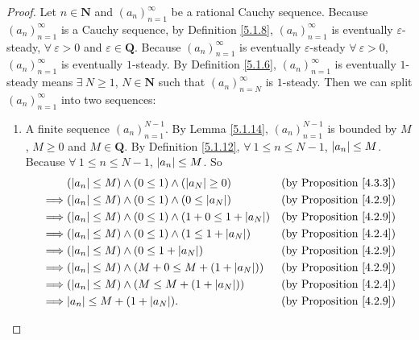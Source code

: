 \begin{proof}
    Let \(n \in \mathbf{N}\) and \((a_n)_{n = 1}^{\infty}\) be a rational Cauchy sequence.
    Because \((a_n)_{n = 1}^{\infty}\) is a Cauchy sequence, by Definition \ref{5.1.8}, \((a_n)_{n = 1}^{\infty}\) is eventually \(\varepsilon\)-steady, \(\forall\ \varepsilon > 0\) and \(\varepsilon \in \mathbf{Q}\).
    Because \((a_n)_{n = 1}^{\infty}\) is eventually \(\varepsilon\)-steady \(\forall\ \varepsilon > 0\), \((a_n)_{n = 1}^{\infty}\) is eventually \(1\)-steady.
    By Definition \ref{5.1.6}, \((a_n)_{n = 1}^{\infty}\) is eventually \(1\)-steady means \(\exists\ N \geq 1\), \(N \in \mathbf{N}\) such that \((a_n)_{n = N}^{\infty}\) is \(1\)-steady.
    Then we can split \((a_n)_{n = 1}^{\infty}\) into two sequences:
    \begin{enumerate}
        \item A finite sequence \((a_n)_{n = 1}^{N - 1}\).
              By Lemma \ref{5.1.14}, \((a_n)_{n = 1}^{N - 1}\) is bounded by \(M\), \(M \geq 0\) and \(M \in \mathbf{Q}\).
              By Definition \ref{5.1.12}, \(\forall\ 1 \leq n \leq N - 1\), \(\abs*{a_n} \leq M\).
              Because \(\forall\ 1 \leq n \leq N - 1\), \(\abs*{a_n} \leq M\).
              So
              \begin{align*}
                           & (\abs*{a_n} \leq M) \land (0 \leq 1) \land (\abs*{a_N} \geq 0)         & \text{(by Proposition \ref{4.3.3})} \\
                  \implies & (\abs*{a_n} \leq M) \land (0 \leq 1) \land (0 \leq \abs*{a_N})         & \text{(by Proposition \ref{4.2.9})} \\
                  \implies & (\abs*{a_n} \leq M) \land (0 \leq 1) \land (1 + 0 \leq 1 + \abs*{a_N}) & \text{(by Proposition \ref{4.2.9})} \\
                  \implies & (\abs*{a_n} \leq M) \land (0 \leq 1) \land (1 \leq 1 + \abs*{a_N})     & \text{(by Proposition \ref{4.2.4})} \\
                  \implies & (\abs*{a_n} \leq M) \land (0 \leq 1 + \abs*{a_N})                      & \text{(by Proposition \ref{4.2.9})} \\
                  \implies & (\abs*{a_n} \leq M) \land (M + 0 \leq M + (1 + \abs*{a_N}))            & \text{(by Proposition \ref{4.2.9})} \\
                  \implies & (\abs*{a_n} \leq M) \land (M \leq M + (1 + \abs*{a_N}))                & \text{(by Proposition \ref{4.2.4})} \\
                  \implies & \abs*{a_n} \leq  M + (1 + \abs*{a_N}).                                 & \text{(by Proposition \ref{4.2.9})}

\end{align*}
\end{enumerate}
\end{proof}
